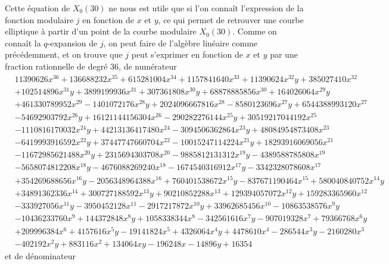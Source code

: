 \documentclass[11pt,a4paper]{article}
\theoremstyle{definition}
\begin{document}
Cette équation de $X_0(30)$ ne nous est utile que si l'on connaît l'expression de la fonction modulaire $j$ en fonction de $x$ et $y$, ce qui permet de retrouver une courbe elliptique à partir d'un point de la courbe modulaire $X_0(30)$. Comme on connaît la $q$-expansion de $j$, on peut faire de l'algèbre linéaire comme précédemment, et on trouve que $j$ peut s'exprimer en fonction de $x$ et $y$ par une fraction rationnelle de degré 36, de numérateur
$$ \begin{aligned}
 &11390626x^{36} + 136688232x^{35} + 615281004x^{34} + 1157841640x^{33} + 11390624x^{32}y + 385027410x^{32} \\
 &+ 102514896x^{31}y + 3899199936x^{31} + 307361808x^{30}y + 68878885856x^{30} + 164026064x^{29}y  \\
 &+ 461330789952x^{29} - 1401072176x^{28}y + 2024096667816x^{28} - 8580123696x^{27}y + 6544388993120x^{27} \\
 &- 54692903792x^{26}y + 16121144156304x^{26} - 290282276144x^{25}y + 30519217044192x^{25} \\
 &- 1110816170032x^{24}y + 44213136417480x^{24} - 3094506362864x^{23}y + 48084954873408x^{23} \\
 &- 6419993916592x^{22}y + 37447747660704x^{22} - 10015247114224x^{21}y + 18293916069056x^{21} \\
 &- 11672985621488x^{20}y + 2315694303708x^{20} - 9885812131312x^{19}y - 4389588785808x^{19} \\
 &- 5658074812208x^{18}y - 4676088269240x^{18} - 1674540316912x^{17}y - 3342328078608x^{17} \\
 &+ 354269688656x^{16}y - 2056348964388x^{16} + 760401538672x^{15}y - 837671190464x^{15} + 580040840752x^{14}y \\
 & + 34891362336x^{14} + 300727188592x^{13}y + 90210852288x^{13} + 129394057072x^{12}y + 159283365960x^{12} \\
  &- 333927056x^{11}y - 3950452128x^{11} - 2917217872x^{10}y + 33962685456x^{10} - 10863538576x^9y \\
  &- 10436233760x^9 + 144372848x^8y + 1058338344x^8 - 342561616x^7y - 907019328x^7 + 79366768x^6y \\
  &+ 209996384x^6 + 4157616x^5y - 19141824x^5 + 4326064x^4y + 4478610x^4 - 286544x^3y - 2160280x^3 \\
  &- 402192x^2y + 883116x^2 + 134064xy - 196248x - 14896y + 16354
\end{aligned}
$$
et de dénominateur
\end{document}
